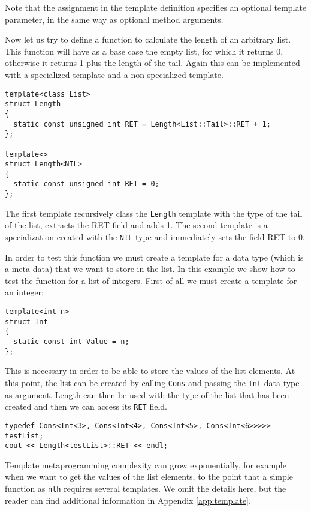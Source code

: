 \noindent
Note that the assignment in the template definition specifies an optional template parameter, in the same way as optional method arguments. 

Now let us try to define a function to calculate the length of an arbitrary list. This function will have as a base case the empty list, for which it returns 0, otherwise it returns 1 plus the length of the tail. Again this can be implemented with a specialized template and a non-specialized template.

\begin{lstlisting}
template<class List>
struct Length
{
  static const unsigned int RET = Length<List::Tail>::RET + 1;
};

template<>
struct Length<NIL>
{
  static const unsigned int RET = 0;
};
\end{lstlisting}

\noindent
The first template recursively class the \texttt{Length} template with the type of the tail of the list, extracts the RET field and adds 1. The second template is a specialization created with the \texttt{NIL} type and immediately sets the field RET to 0.

In order to test this function we must create a template for a data type (which is a meta-data) that we want to store in the list. In this example we show how to test the function for a list of integers. First of all we must create a template for an integer:

\begin{lstlisting}
template<int n>
struct Int
{
  static const int Value = n;
};
\end{lstlisting}

\noindent
This is necessary in order to be able to store the values of the list elements. At this point, the list can be created by calling \texttt{Cons} and passing the \texttt{Int} data type as argument. Length can then be used with the type of the list that has been created and then we can access its \texttt{RET} field.

\begin{lstlisting}
typedef Cons<Int<3>, Cons<Int<4>, Cons<Int<5>, Cons<Int<6>>>>> testList;
cout << Length<testList>::RET << endl;
\end{lstlisting} 

Template metaprogramming complexity can grow exponentially, for example when we want to get the values of the list elements, to the point that a simple function as \texttt{nth} requires several templates. We omit the details here, but the reader can find additional information in Appendix \ref{app:template}.
